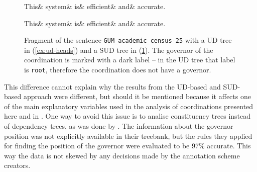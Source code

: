 \begin{figure}[H]
\begin{exe}
\centering
\ex\label{ex:ud-heads}
\begin{dependency}[baseline=-\the\dimexpr\fontdimen22\textfont2\relax]
	\begin{deptext}[column sep=.4cm]
			This\& system\& is\& efficient\& and\& accurate.\\
		\end{deptext} 
\end{dependency}
\end{exe}

\begin{exe}
\centering
\ex\label{ex:sud-heads}
\begin{dependency}[baseline=-\the\dimexpr\fontdimen22\textfont2\relax]
	\begin{deptext}[column sep=.4cm]
			This\& system\& is\& efficient\& and\& accurate.\\
		\end{deptext} 
\end{dependency}
\end{exe}
\caption{Fragment of the sentence \texttt{GUM\_academic\_census-25} with a UD tree in (\ref{ex:ud-heads}) and a SUD tree in (\ref{ex:sud-heads}). The governor of the coordination is marked with a dark label -- in the UD tree that label is \texttt{root}, therefore the coordination does not have a governor.}
\end{figure}

This difference cannot explain why the results from the UD-based and SUD-based approach were different, but should it be mentioned because it affects one of the main explanatory variables used in the analysis of coordinations presented here and in \cite{prz:etal:24}. One way to avoid this issue is to analise constituency trees instead of dependency trees, as was done by \cite{prz:woz:23}. The information about the governor position was not explicitly available in their treebank, but the rules they applied for finding the position of the governor were evaluated to be 97\% accurate. This way the data is not skewed by any decisions made by the annotation scheme creators. 

